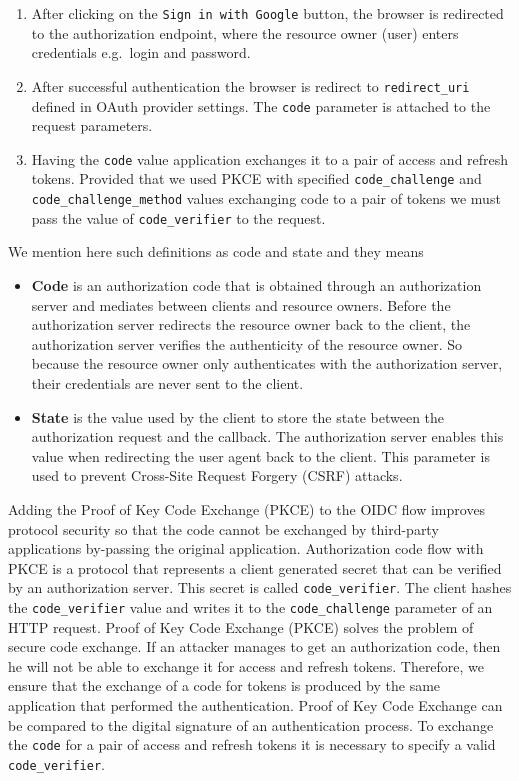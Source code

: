 \begin{enumerate}
    \item After clicking on the \texttt{Sign in with Google} button,
    the browser is redirected to the authorization endpoint, where the resource owner (user) enters credentials e.g.\ login and password.
    \item After successful authentication the browser is redirect to \texttt{redirect\_uri} defined in OAuth provider settings.
    The \texttt{code} parameter is attached to the request parameters.
    \item Having the \texttt{code} value application exchanges it to a pair of access and refresh tokens.
    Provided that we used PKCE with specified \texttt{code\_challenge} and \texttt{code\_challenge\_method} values exchanging code to a pair of tokens
    we must pass the value of \texttt{code\_verifier} to the request.
\end{enumerate}

We mention here such definitions as code and state and they means
\begin{itemize}
    \item \textbf{Code} is an authorization code that is obtained through an authorization
    server and mediates between clients and resource owners.
    Before the authorization server redirects the resource owner back to the client,
    the authorization server verifies the authenticity of the resource owner.
    So because the resource owner only authenticates with the authorization server,
    their credentials are never sent to the client.
    \item \textbf{State} is the value used by the client to store the state between the authorization request and the callback.
    The authorization server enables this value when redirecting the user agent back to the client.
    This parameter is used to prevent Cross-Site Request Forgery (CSRF) attacks.
\end{itemize}

Adding the Proof of Key Code Exchange (PKCE) to the OIDC flow improves protocol security so that the code
cannot be exchanged by third-party applications by-passing the original application.
Authorization code flow with PKCE is a protocol that represents a client generated secret that can be verified
by an authorization server.
This secret is called \texttt{code\_verifier}.
The client hashes the \texttt{code\_verifier} value and writes it to the \texttt{code\_challenge} parameter
of an HTTP request.
Proof of Key Code Exchange (PKCE) solves the problem of secure code exchange.
If an attacker manages to get an authorization code, then he will not be able to exchange
it for access and refresh tokens.
Therefore, we ensure that the exchange of a code for tokens is produced by the same application
that performed the authentication.
Proof of Key Code Exchange can be compared to the digital signature of an authentication process.
To exchange the \texttt{code} for a pair of access and refresh tokens it is necessary to specify
a valid \texttt{code\_verifier}.

